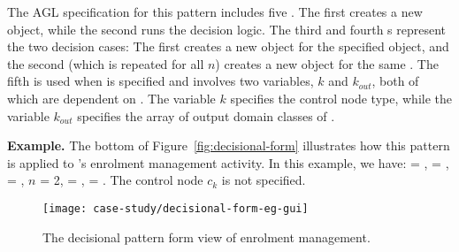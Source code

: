 The AGL specification for this pattern includes five . The first  creates a new  object, while the second  runs the decision logic. The third and fourth s represent the two decision cases: The first creates a new  object for the specified  object, and the second (which is repeated for all $n$) creates a new  object for the same . The fifth  is used when  is specified and involves two variables, $k$ and $k_{out}$, both of which are dependent on . The variable $k$ specifies the control node type, while the variable $k_{out}$ specifies the array of output domain classes of .

\noindent\textbf{Example.} 
The bottom of Figure~\ref{fig:decisional-form} illustrates how this pattern is applied to \courseman's enrolment management activity. %
In this example, we have:  = ,  = ,  = , $ n $ = 2,  = ,  = .
The control node $ c_k $ is not specified.

\begin{figure*}[ht]
	\begin{center}
		\texttt{[image: case-study/decisional-form-eg-gui]}
	\end{center}
	\vspace{-0.5cm}
	\caption{The decisional pattern form view of enrolment management.} %
	\label{fig:decisional-form-eg-gui}
	\vspace{-0.3cm}
\end{figure*}

